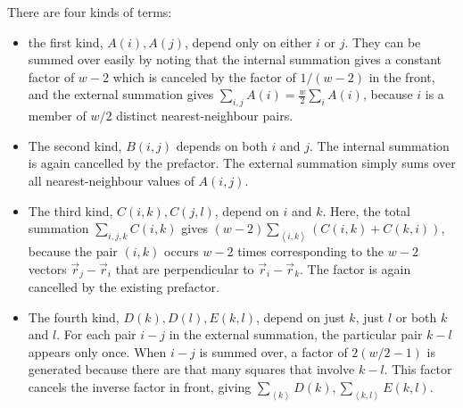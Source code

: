 \documentclass{report}
\numberwithin{equation}{section}
\begin{document}
There are four kinds of terms:
\begin{itemize}
	\item the first kind, \(A(i), A(j)\), depend only on either \(i\) or \(j\). They can be summed over easily by noting that the internal summation gives a constant factor of \(w-2\) which is canceled by the factor of \(1/(w-2)\) in the front, and the external summation gives \(\sum_{i,j}A(i) = \frac{w}{2} \sum_i A(i)\), because \(i\) is a member of \(w/2\) distinct nearest-neighbour pairs. 
	\item The second kind, \(B(i,j)\) depends on both \(i\) and \(j\). The internal summation is again cancelled by the prefactor. The external summation simply sums over all nearest-neighbour values of \(A(i,j)\).
	\item The third kind, \(C(i,k), C(j,l)\), depend on \(i\) and \(k\). Here, the total summation \(\sum_{i,j,k}C(i,k)\) gives \((w-2)\sum_{\left<i,k\right>}\left(C(i,k) + C(k,i)\right)\), because the pair \((i,k)\) occurs \(w-2\) times corresponding to the \(w-2\) vectors \(\vec r_j - \vec r_i\) that are perpendicular to \(\vec r_i - \vec r_k\). The factor is again cancelled by the existing prefactor. 
	\item The fourth kind, \(D(k), D(l), E(k,l)\), depend on just \(k\), just \(l\) or both \(k\) and \(l\). For each pair \(i-j\) in the external summation, the particular pair \(k-l\) appears only once. When \(i-j\) is summed over, a factor of \(2(w/2-1)\) is generated because there are that many squares that involve \(k-l\). This factor cancels the inverse factor in front, giving \(\sum_{\left<k\right>} D(k), \sum_{\left<k,l \right>}E(k,l)\).
\end{itemize}
\end{document}
